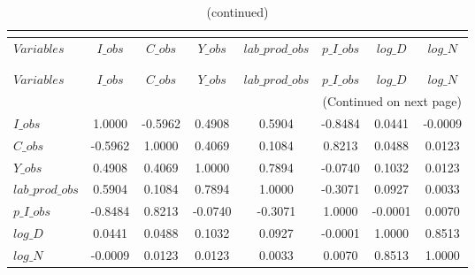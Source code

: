  
\begin{center}
\begin{longtable}{lccccccc} 
\caption{MATRIX OF CORRELATIONS}\\
 \label{Table:th_corr_matrix}\\
\toprule 
$Variables       $	 & 	 $           I\_obs$	 & 	 $           C\_obs$	 & 	 $           Y\_obs$	 & 	 $  lab\_prod\_obs$	 & 	 $       p\_I\_obs$	 & 	 $           log\_D$	 & 	 $           log\_N$\\
\midrule \endfirsthead 
\caption{(continued)}\\
 \toprule \\ 
$Variables       $	 & 	 $           I\_obs$	 & 	 $           C\_obs$	 & 	 $           Y\_obs$	 & 	 $  lab\_prod\_obs$	 & 	 $       p\_I\_obs$	 & 	 $           log\_D$	 & 	 $           log\_N$\\
\midrule \endhead 
\midrule \multicolumn{8}{r}{(Continued on next page)} \\ \bottomrule \endfoot 
\bottomrule \endlastfoot 
$I\_obs          $	 & 	            1.0000	 & 	           -0.5962	 & 	            0.4908	 & 	            0.5904	 & 	           -0.8484	 & 	            0.0441	 & 	           -0.0009 \\ 
$C\_obs          $	 & 	           -0.5962	 & 	            1.0000	 & 	            0.4069	 & 	            0.1084	 & 	            0.8213	 & 	            0.0488	 & 	            0.0123 \\ 
$Y\_obs          $	 & 	            0.4908	 & 	            0.4069	 & 	            1.0000	 & 	            0.7894	 & 	           -0.0740	 & 	            0.1032	 & 	            0.0123 \\ 
$lab\_prod\_obs  $	 & 	            0.5904	 & 	            0.1084	 & 	            0.7894	 & 	            1.0000	 & 	           -0.3071	 & 	            0.0927	 & 	            0.0033 \\ 
$p\_I\_obs       $	 & 	           -0.8484	 & 	            0.8213	 & 	           -0.0740	 & 	           -0.3071	 & 	            1.0000	 & 	           -0.0001	 & 	            0.0070 \\ 
$log\_D          $	 & 	            0.0441	 & 	            0.0488	 & 	            0.1032	 & 	            0.0927	 & 	           -0.0001	 & 	            1.0000	 & 	            0.8513 \\ 
$log\_N          $	 & 	           -0.0009	 & 	            0.0123	 & 	            0.0123	 & 	            0.0033	 & 	            0.0070	 & 	            0.8513	 & 	            1.0000 \\ 
\end{longtable}
 \end{center}
